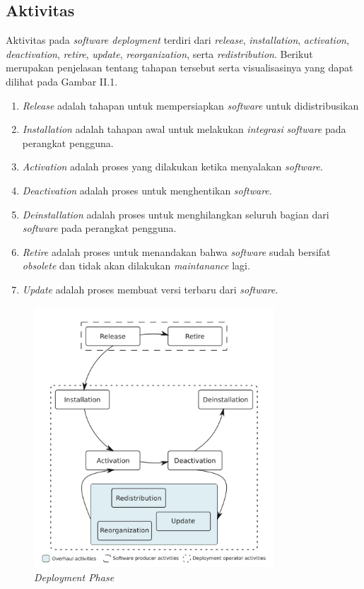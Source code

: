 \subsection{Aktivitas}

Aktivitas pada \textit{software deployment} terdiri dari
\textit{release}, \textit{installation}, \textit{activation}, \textit{deactivation}, \textit{retire}, \textit{update}, \textit{reorganization}, serta \textit{redistribution}. Berikut merupakan penjelasan tentang tahapan tersebut serta visualisasinya yang dapat dilihat pada Gambar II.1.

\begin{enumerate}
  \item \textit{Release} adalah tahapan untuk mempersiapkan \textit{software} untuk didistribusikan
  \item \textit{Installation} adalah tahapan awal untuk melakukan \textit{integrasi} \textit{software} pada perangkat pengguna.
  \item \textit{Activation} adalah proses yang dilakukan ketika menyalakan \textit{software}.
  \item \textit{Deactivation} adalah proses untuk menghentikan \textit{software}.
  \item \textit{Deinstallation} adalah proses untuk menghilangkan seluruh bagian dari \textit{software} pada perangkat pengguna.
  \item \textit{Retire} adalah proses untuk menandakan bahwa \textit{software} sudah bersifat \textit{obsolete} dan tidak akan dilakukan \textit{maintanance} lagi.
  \item \textit{Update} adalah proses membuat versi terbaru dari \textit{software}.
\end{enumerate}

\begin{figure}[ht]
  \centering
  \includegraphics[width=0.8\textwidth]{resources/chapter-2/deployment-phase.jpg}
  \caption{\textit{Deployment Phase \parencite{ARCANGELI2015198}}}
  \label{fig:deployment-phase}
\end{figure}